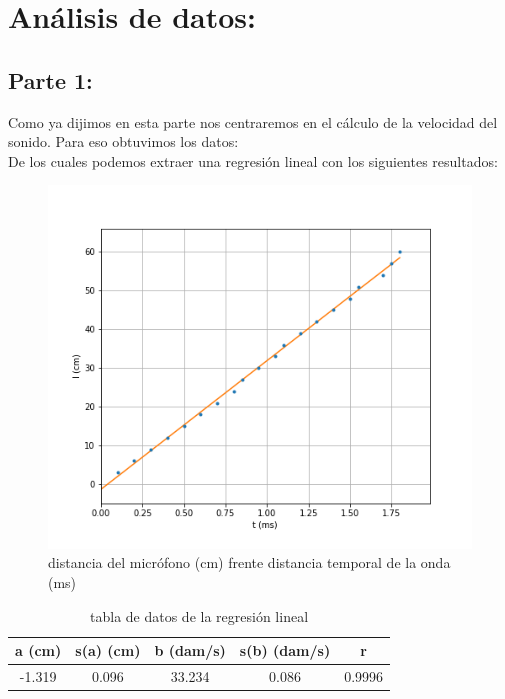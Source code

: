 \documentclass[12pt,a4paper]{article}
\begin{document}
\section{Análisis de datos:}

\subsection{Parte 1: \label{SS:parte 1}}
Como ya dijimos en esta parte nos centraremos en el cálculo de la velocidad del sonido. Para eso obtuvimos los datos:  \\


De los cuales podemos extraer una regresión lineal con los siguientes resultados: \\

\begin{figure}[h!] \centering 
\includegraphics[scale=0.6]{regresiónlineal.png}
\caption{distancia del micrófono (cm) frente distancia temporal de la onda (ms)}
\label{fig:velocidad-sonido}
\end{figure}

\begin{table}[h!]
\centering
\begin{tabular}{|c|c|c|c|c|}
\hline
a  (cm)	 & s(a) (cm) 	 & b (dam/s)	 & s(b) (dam/s) 	 & r \\   \hline
-1.319 	 & 0.096 	 & 33.234 	 & 0.086 	 & 0.9996 \\ \hline
\end{tabular}
\caption{tabla de datos de la regresión lineal}
\label{tab:velocidad-sonido}
\end{table}
\end{document}
